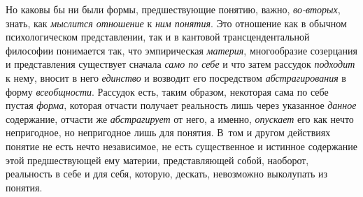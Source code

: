 Но каковы бы ни были формы, предшествующие понятию, важно,
{\em во-вторых}, знать, как {\em мыслится отношение} к {\em ним понятия}.
Это отношение как в обычном психологическом представлении,
так и в кантовой трансцендентальной философии понимается так, что
эмпирическая {\em материя},
многообразие созерцания и представления существует сначала
{\em само по себе} и что затем рассудок {\em подходит} к нему, вносит в него
{\em единство} и возводит его посредством {\em абстрагирования} в форму
{\em всеобщности}. Рассудок есть, таким образом, некоторая сама
по себе пустая {\em форма},
которая отчасти получает реальность лишь через указанное
{\em данное} содержание, отчасти же {\em абстрагирует}
от него, а именно, {\em опускает} его как
нечто непригодное, но непригодное лишь для понятия. В~том и другом
действиях понятие не есть нечто независимое, не есть существенное и
истинное содержание этой предшествующей ему материи, представляющей собой,
наоборот, реальность в себе и для себя, которую, дескать, невозможно
выколупать из понятия.

